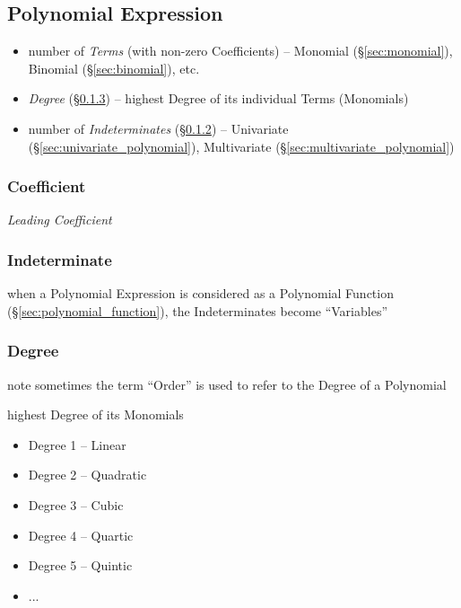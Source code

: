 \subsection{Polynomial Expression}\label{sec:polynomial_expression}

\begin{itemize}
  \item number of \emph{Terms} (with non-zero Coefficients) -- Monomial
    (\S\ref{sec:monomial}), Binomial (\S\ref{sec:binomial}), etc.
  \item \emph{Degree} (\S\ref{sec:degree}) -- highest Degree of its individual
    Terms (Monomials)
  \item number of \emph{Indeterminates} (\S\ref{sec:indeterminate}) --
    Univariate (\S\ref{sec:univariate_polynomial}), Multivariate
    (\S\ref{sec:multivariate_polynomial})
\end{itemize}




\subsubsection{Coefficient}\label{sec:coefficient}

\emph{Leading Coefficient}



\subsubsection{Indeterminate}\label{sec:indeterminate}

when a Polynomial Expression is considered as a Polynomial Function
(\S\ref{sec:polynomial_function}), the Indeterminates become ``Variables''



\subsubsection{Degree}\label{sec:degree}

note sometimes the term ``Order'' is used to refer to the Degree of a
Polynomial

highest Degree of its Monomials

\begin{itemize}
  \item Degree 1 -- Linear
  \item Degree 2 -- Quadratic
  \item Degree 3 -- Cubic
  \item Degree 4 -- Quartic
  \item Degree 5 -- Quintic
  \item ...
\end{itemize}

